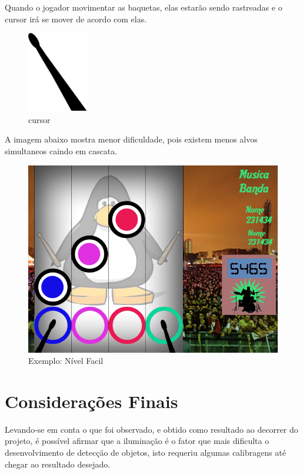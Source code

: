 \documentclass{sciposter}
\begin{document}
\begin{multicols}{3}
Quando o jogador movimentar as baquetas, elas estarão sendo rastreadas e o cursor irá se mover de acordo com elas.

\begin{figure}[!htb]
\centering
\includegraphics[scale=4.3]{cursor_right.png}
\caption{cursor}
\end{figure}

A imagem abaixo mostra menor dificuldade, pois existem menos alvos simultaneos caindo em cascata.

\begin{figure}[!htb]
\centering
\includegraphics[scale=2.3]{easy.png}
\caption{Exemplo: Nível Facil}
\end{figure}

\section{Considerações Finais}
Levando-se em conta o que foi observado, e obtido como resultado ao decorrer do projeto, é possível afirmar que a iluminação é o fator que mais dificulta o desenvolvimento de detecção de objetos, isto requeriu algumas calibragens até chegar ao resultado desejado. 


\begin{thebibliography}{7}


\end{thebibliography}
\end{multicols}
\end{document}
